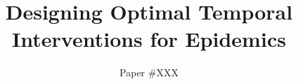 \documentclass[sigconf]{aamas}  %
\begin{document}
\title{Designing Optimal Temporal Interventions for Epidemics}  %


\author{Paper \#XXX}  %

%
%
%
%
%
%
%
%
\end{document}
